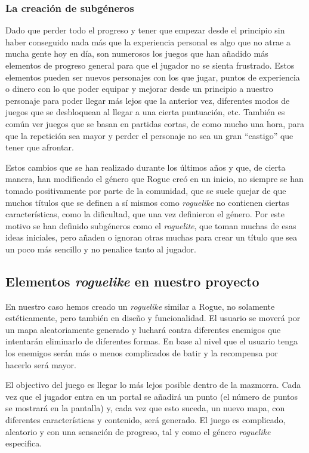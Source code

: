 \subsubsection{La creación de subgéneros}

Dado que perder todo el progreso y tener que empezar desde el principio sin haber conseguido nada más que la experiencia personal es algo que no atrae a mucha gente hoy en día, son numerosos los juegos que han añadido más elementos de progreso general para que el jugador no se sienta frustrado. Estos elementos pueden ser nuevos personajes con los que jugar, puntos de experiencia o dinero con lo que poder equipar y mejorar desde un principio a nuestro personaje para poder llegar más lejos que la anterior vez, diferentes modos de juegos que se desbloquean al llegar a una cierta puntuación, etc.
También es común ver juegos que se basan en partidas cortas, de como mucho una hora, para que la repetición sea mayor y perder el personaje no sea un gran ``castigo'' que tener que afrontar.

Estos cambios que se han realizado durante los últimos años y que, de cierta manera, han modificado el género que Rogue creó en un inicio, no siempre se han tomado positivamente por parte de la comunidad, que se suele quejar de que muchos títulos que se definen a sí mismos como \textit{roguelike} no contienen ciertas características, como la dificultad, que una vez definieron el género. Por este motivo se han definido subgéneros como el \textit{roguelite}, que toman muchas de esas ideas iniciales, pero añaden o ignoran otras muchas para crear un título que sea un poco más sencillo y no penalice tanto al jugador.

\subsection{Elementos \textit{roguelike} en nuestro proyecto}

En nuestro caso hemos creado un \textit{roguelike} similar a Rogue, no solamente estéticamente, pero también en diseño y funcionalidad. El usuario se moverá por un mapa aleatoriamente generado y luchará contra diferentes enemigos que intentarán eliminarlo de diferentes formas. En base al nivel que el usuario tenga los enemigos serán más o menos complicados de batir y la recompensa por hacerlo será mayor.

El objectivo del juego es llegar lo más lejos posible dentro de la mazmorra. Cada vez que el jugador entra en un portal se añadirá un punto (el número de puntos se mostrará en la pantalla) y, cada vez que esto suceda, un nuevo mapa, con diferentes características y contenido, será generado. El juego es complicado, aleatorio y con una sensación de progreso, tal y como el género \textit{roguelike} especifica.

